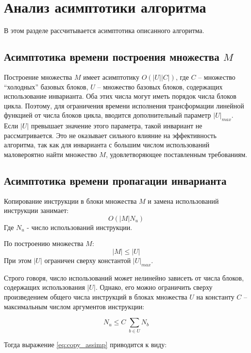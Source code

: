 \section{Анализ асимптотики алгоритма}

В этом разделе рассчитывается асимптотика описанного алгоритма.

\subsection{Асимптотика времени построения множества \texorpdfstring{$M$}{M}}
Построение множества $M$ имеет асимптотику $ O(|U| |C|) $, где $C$ -- множество \enquote{холодных} базовых блоков, $U$ -- множество базовых блоков, содержащих использование инварианта.
Оба этих числа могут иметь порядок числа блоков цикла.
Поэтому, для ограничения времени исполнения трансформации линейной функцией от числа блоков цикла, вводится дополнительный параметр $|U|_{max}$.
Если $|U|$ превышает значение этого параметра, такой инвариант не рассматривается.
Это не оказывает сильного влияние на эффективность алгоритма, так как для инварианта с большим числом использований маловероятно найти множество $M$, удовлетворяющее поставленным требованиям.

\subsection{Асимптотика времени пропагации инварианта}

Копирование инструкции в блоки множества $M$ и замена использований инструкции занимает:
\begin{equation} \label{eq:copy_assimp}
    O(|M| N_u)
\end{equation}
Где $N_u$ - число использований инструкции.

По построению множества $M$:
$$ |M| \leq |U| $$
При этом $|U|$ ограничен сверху константой $|U|_{max}$.

Строго говоря, число использований может нелинейно зависеть от числа блоков, содержащих использования $|U|$.
Однако, его можно ограничить сверху произведением общего числа инструкций в блоках множества $U$ на константу $C$ -- максимальным числом аргументов инструкции:

\begin{equation} \label{eq:sum_leq_one}
N_u \leq C \; \sum_{b \in U} N_b
\end{equation}

Тогда выражение \ref{eq:copy_assimp} приводится к виду:

